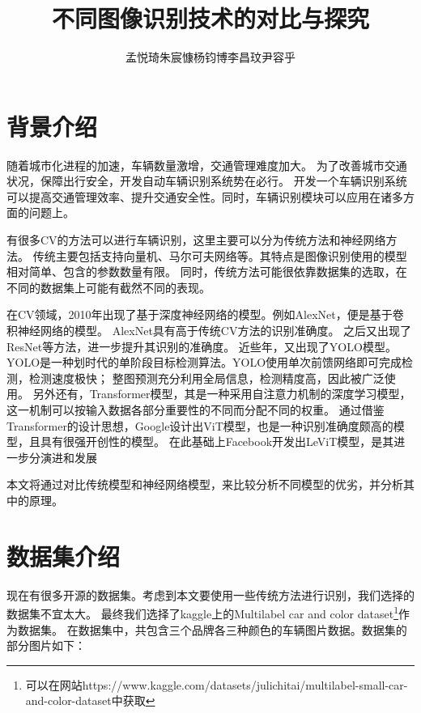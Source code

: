 \documentclass[UTF8]{ctexart}
\title{不同图像识别技术的对比与探究}
\author{孟悦琦\quad 朱宸慷\quad 杨钧博\quad 李昌玟\quad 尹容乎}
\begin{document}
\maketitle

\section{背景介绍}
随着城市化进程的加速，车辆数量激增，交通管理难度加大。
为了改善城市交通状况，保障出行安全，开发自动车辆识别系统势在必行。
开发一个车辆识别系统可以提高交通管理效率、提升交通安全性。同时，车辆识别模块可以应用在诸多方面的问题上。 \par

有很多CV的方法可以进行车辆识别，这里主要可以分为传统方法和神经网络方法。
传统主要包括支持向量机、马尔可夫网络等。其特点是图像识别使用的模型相对简单、包含的参数数量有限。
同时，传统方法可能很依靠数据集的选取，在不同的数据集上可能有截然不同的表现。 \par

在CV领域，2010年出现了基于深度神经网络的模型。例如AlexNet，便是基于卷积神经网络的模型。
AlexNet具有高于传统CV方法的识别准确度\cite{AlexNet}。
之后又出现了ResNet\cite{ResNet}等方法，进一步提升其识别的准确度。
近些年，又出现了YOLO模型。
YOLO是一种划时代的单阶段目标检测算法。YOLO使用单次前馈网络即可完成检测，检测速度极快；
整图预测充分利用全局信息，检测精度高，因此被广泛使用\cite{YOLO}。
另外还有，Transformer模型，其是一种采用自注意力机制的深度学习模型，这一机制可以按输入数据各部分重要性的不同而分配不同的权重。
通过借鉴Transformer的设计思想，Google设计出ViT模型，也是一种识别准确度颇高的模型，且具有很强开创性的模型\cite{Vision_Transformers}。
在此基础上Facebook开发出LeViT模型，是其进一步分演进和发展\cite{LeViT} \par

本文将通过对比传统模型和神经网络模型，来比较分析不同模型的优劣，并分析其中的原理。

\section{数据集介绍}
现在有很多开源的数据集。考虑到本文要使用一些传统方法进行识别，我们选择的数据集不宜太大。
最终我们选择了kaggle上的Multilabel car and color dataset\footnote{可以在网站https://www.kaggle.com/datasets/julichitai/multilabel-small-car-and-color-dataset中获取}作为数据集。
在数据集中，共包含三个品牌各三种颜色的车辆图片数据。数据集的部分图片如下：
\end{document}
